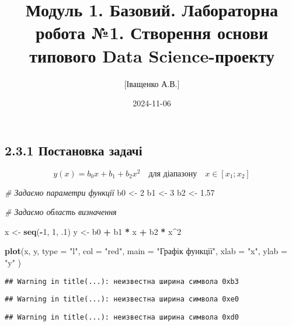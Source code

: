 \documentclass[
  12pt,
]{article}
\title{Модуль 1. Базовий. Лабораторна робота №1. Створення основи
типового Data Science-проекту}
\author{{[}Іващенко А.В.{]}}
\date{2024-11-06}
\newenvironment{Shaded}{\begin{snugshade}}{\end{snugshade}}
\newcommand{\AttributeTok}[1]{\textcolor[rgb]{0.13,0.29,0.53}{#1}}
\newcommand{\CommentTok}[1]{\textcolor[rgb]{0.56,0.35,0.01}{\textit{#1}}}
\newcommand{\DecValTok}[1]{\textcolor[rgb]{0.00,0.00,0.81}{#1}}
\newcommand{\FloatTok}[1]{\textcolor[rgb]{0.00,0.00,0.81}{#1}}
\newcommand{\FunctionTok}[1]{\textcolor[rgb]{0.13,0.29,0.53}{\textbf{#1}}}
\newcommand{\NormalTok}[1]{#1}
\newcommand{\OtherTok}[1]{\textcolor[rgb]{0.56,0.35,0.01}{#1}}
\newcommand{\SpecialCharTok}[1]{\textcolor[rgb]{0.81,0.36,0.00}{\textbf{#1}}}
\newcommand{\StringTok}[1]{\textcolor[rgb]{0.31,0.60,0.02}{#1}}
\begin{document}
\maketitle

{
\setcounter{tocdepth}{2}
\tableofcontents
}
\subsection{2.3.1 Постановка
задачі}\label{ux43fux43eux441ux442ux430ux43dux43eux432ux43aux430-ux437ux430ux434ux430ux447ux456}

\[
y(x) = b_0 x + b_1 + b_2 x^2 \quad \text{для діапазону} \quad x \in [x_1; x_2]
\]

\begin{Shaded}
\begin{Highlighting}[]
\CommentTok{\# Задаємо параметри функції}
\NormalTok{b0 }\OtherTok{\textless{}{-}} \DecValTok{2}
\NormalTok{b1 }\OtherTok{\textless{}{-}} \DecValTok{3}
\NormalTok{b2 }\OtherTok{\textless{}{-}} \FloatTok{1.57}

\CommentTok{\# Задаємо область визначення}

\NormalTok{x }\OtherTok{\textless{}{-}} \FunctionTok{seq}\NormalTok{(}\SpecialCharTok{{-}}\DecValTok{1}\NormalTok{, }\DecValTok{1}\NormalTok{, .}\DecValTok{1}\NormalTok{)}
\NormalTok{y }\OtherTok{\textless{}{-}}\NormalTok{ b0 }\SpecialCharTok{+}\NormalTok{ b1 }\SpecialCharTok{*}\NormalTok{ x }\SpecialCharTok{+}\NormalTok{ b2 }\SpecialCharTok{*}\NormalTok{ x}\SpecialCharTok{\^{}}\DecValTok{2}

\FunctionTok{plot}\NormalTok{(x, y,}
     \AttributeTok{type =} \StringTok{"l"}\NormalTok{,}
     \AttributeTok{col =} \StringTok{"red"}\NormalTok{,}
     \AttributeTok{main =} \StringTok{"Графік функції"}\NormalTok{,}
     \AttributeTok{xlab =} \StringTok{"x"}\NormalTok{,}
     \AttributeTok{ylab =} \StringTok{"y"}
\NormalTok{     )}
\end{Highlighting}
\end{Shaded}

\begin{verbatim}
## Warning in title(...): неизвестна ширина символа 0xb3
\end{verbatim}

\begin{verbatim}
## Warning in title(...): неизвестна ширина символа 0xe0
\end{verbatim}

\begin{verbatim}
## Warning in title(...): неизвестна ширина символа 0xd0
\end{verbatim}
\end{document}
